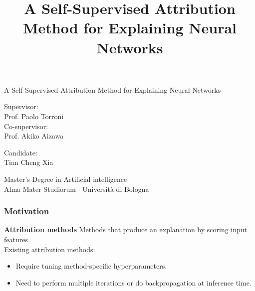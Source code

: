 \documentclass{beamer}
\title{A Self-Supervised Attribution Method for Explaining Neural Networks}
\author{}
\institute{}
\date{}
\begin{document}
{
    \begin{frame}
        \title{}
        \begin{center}
            \vspace*{3em}
            {
                \color{darkred}\LARGE
                A Self-Supervised Attribution Method for Explaining Neural Networks
            }

            \vspace*{2em}
            \small
            \begin{minipage}{0.49\linewidth}
                \raggedright
                Supervisor:\\
                Prof. Paolo Torroni \\
                Co-supervisor: \\
                Prof. Akiko Aizawa
            \end{minipage}
            \begin{minipage}{0.49\linewidth}
                \raggedleft
                Candidate:\\
                Tian Cheng Xia
            \end{minipage}

            \vspace{2em}
            \footnotesize
            Master's Degree in Artificial intelligence \\
            Alma Mater Studiorum $\cdot$ Università di Bologna
        \end{center}
    \end{frame}
    \addtocounter{framenumber}{-1}
}



\begin{frame}
    \frametitle{Motivation}
    \textbf{Attribution methods} Methods that produce an explanation by scoring input features.\\[1em]

    Existing attribution methods:
    \begin{itemize}
        \item Require tuning method-specific hyperparameters.
        \item Need to perform multiple iterations or do backpropagation at inference time.
    \end{itemize}
\end{frame}
\end{document}
